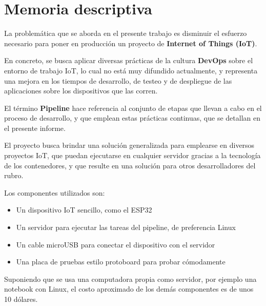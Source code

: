 \chapter{Memoria descriptiva}\label{cap:memoria}
La problemática que se aborda en el presente trabajo es disminuir el esfuerzo necesario para poner en producción un proyecto de \textbf{Internet of Things (IoT)}.

En concreto, se busca aplicar diversas prácticas de la cultura \textbf{DevOps} sobre el entorno de trabajo IoT, lo cual no está muy difundido actualmente, y representa una mejora en los tiempos de desarrollo, de testeo y de despliegue de las aplicaciones sobre los dispositivos que las corren.

El término \textbf{Pipeline} hace referencia al conjunto de etapas que llevan a cabo en el proceso de desarrollo, y que emplean estas prácticas continuas, que se detallan en el presente informe.

El proyecto busca brindar una solución generalizada para emplearse en diversos proyectos IoT, que puedan ejecutarse en cualquier servidor gracias a la tecnología de los contenedores, y que resulte en una solución para otros desarrolladores del rubro.

Los componentes utilizados son:
\begin{itemize}
    \item Un dispositivo IoT sencillo, como el ESP32
    \item Un servidor para ejecutar las tareas del pipeline, de preferencia Linux
    \item Un cable microUSB para conectar el dispositivo con el servidor
    \item Una placa de pruebas estilo protoboard para probar cómodamente
\end{itemize}

Suponiendo que se usa una computadora propia como servidor, por ejemplo una notebook con Linux, el costo aproximado de los demás componentes es de unos 10 dólares.

